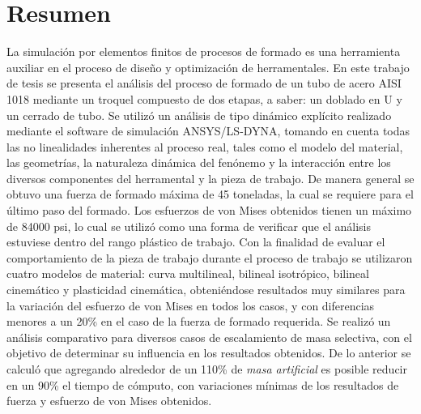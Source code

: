 \chapter*{Resumen}


La simulación por elementos finitos de procesos de formado es una herramienta auxiliar en el proceso de 
diseño y optimización de herramentales. En este trabajo de tesis se presenta el análisis del proceso de formado 
de un tubo de acero AISI 1018 mediante un troquel compuesto de dos etapas, a saber: un doblado en U y un 
cerrado de tubo. Se utilizó un análisis de tipo dinámico explícito realizado mediante el software de simulación 
ANSYS/LS-DYNA\CR, tomando en cuenta todas las no linealidades inherentes al proceso real, tales 
como el modelo del material, las geometrías, la naturaleza dinámica del fenónemo y la interacción 
entre los diversos componentes del herramental y la pieza de trabajo.
De manera general se obtuvo una fuerza de formado máxima de 45 toneladas, la cual se requiere para el último 
paso del formado. Los esfuerzos de von Mises obtenidos tienen un máximo de 84000 psi, lo cual se utilizó 
como una forma de verificar que el análisis estuviese dentro del rango plástico de trabajo.
Con la finalidad de evaluar el comportamiento de la pieza de trabajo durante el proceso de trabajo se 
utilizaron cuatro modelos de material: curva multilineal, bilineal isotrópico, bilineal cinemático y 
plasticidad cinemática, obteniéndose resultados muy similares para la variación del esfuerzo de von Mises 
en todos los casos, y con diferencias menores a un 20\% en el caso de la fuerza de formado requerida. 
Se realizó un análisis comparativo para diversos casos de escalamiento de masa selectiva, con el objetivo 
de determinar su influencia en los resultados obtenidos. De lo anterior se calculó que agregando alrededor de 
un 110\% de \textit{masa artificial} es posible reducir en un 90\% el tiempo de cómputo, con variaciones mínimas 
de los resultados de fuerza y esfuerzo de von Mises obtenidos.
